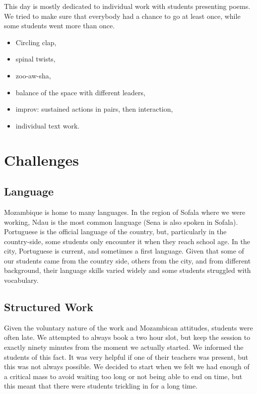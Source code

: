 \documentclass[article,twocolumn,twoside]{memoir}
\begin{document}
This day is mostly dedicated to individual work with students presenting poems.
We tried to make sure that everybody had a chance to go at least once, while
some students went more than once.

\begin{itemize}
\item Circling clap,
\item spinal twists,
\item zoo-aw-sha,
\item balance of the space with different leaders,
\item improv: sustained actions in pairs, then interaction,
\item individual text work.
\end{itemize}

\chapter{Challenges}
\section{Language}

Mozambique is home to many languages. In the region of Sofala where we were
working, Ndau is the most common language (Sena is also spoken in Sofala).
Portuguese is the official language of the country, but, particularly in the
country-side, some students only encounter it when they reach school age. In
the city, Portuguese is current, and sometimes a first language. Given that
some of our students came from the country side, others from the city, and from
different background, their language skills varied widely and some students
struggled with vocabulary.

\section{Structured Work}

Given the voluntary nature of the work and Mozambican attitudes, students were
often late. We attempted to always book a two hour slot, but keep the session
to exactly ninety minutes from the moment we actually started. We informed the
students of this fact. It was very helpful if one of their teachers was
present, but this was not always possible. We decided to start when we felt we
had enough of a critical mass to avoid waiting too long or not being able to
end on time, but this meant that there were students trickling in for a long
time.
\end{document}
